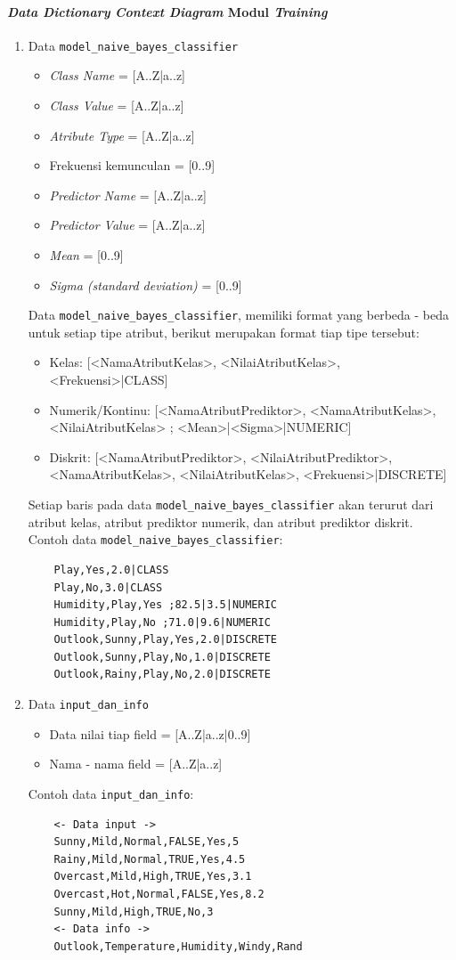 \paragraph{\textit{Data Dictionary} \textit{Context Diagram} Modul \textit{Training}}
\begin{enumerate}
	\item{Data \verb|model_naive_bayes_classifier|}
	\begin{itemize}
		\item \textit{Class Name} = [A..Z|a..z] 
		\item \textit{Class Value} = [A..Z|a..z] 
		\item \textit{Atribute Type} = [A..Z|a..z] 
		\item Frekuensi kemunculan = [0..9] 
		\item \textit{Predictor Name} = [A..Z|a..z]
		\item \textit{Predictor Value} = [A..Z|a..z]
		\item \textit{Mean} = [0..9]
		\item \textit{Sigma (standard deviation)} = [0..9]
	\end{itemize}

	Data \verb|model_naive_bayes_classifier|, memiliki format yang berbeda - beda untuk setiap tipe atribut, berikut merupakan format tiap tipe tersebut:
	\begin{itemize}
		\item Kelas: [<NamaAtributKelas>, <NilaiAtributKelas>, <Frekuensi>|CLASS]
		\item Numerik/Kontinu: [<NamaAtributPrediktor>, <NamaAtributKelas>, <NilaiAtributKelas> ; <Mean>|<Sigma>|NUMERIC]
		\item Diskrit: [<NamaAtributPrediktor>, <NilaiAtributPrediktor>, <NamaAtributKelas>, <NilaiAtributKelas>, <Frekuensi>|DISCRETE]
	\end{itemize}
	
	Setiap baris pada data \verb|model_naive_bayes_classifier| akan terurut dari atribut kelas, atribut prediktor numerik, dan atribut prediktor diskrit. Contoh data \verb|model_naive_bayes_classifier|:
	\begin{lstlisting}
	Play,Yes,2.0|CLASS
	Play,No,3.0|CLASS
	Humidity,Play,Yes ;82.5|3.5|NUMERIC
	Humidity,Play,No ;71.0|9.6|NUMERIC
	Outlook,Sunny,Play,Yes,2.0|DISCRETE
	Outlook,Sunny,Play,No,1.0|DISCRETE
	Outlook,Rainy,Play,No,2.0|DISCRETE
	\end{lstlisting}
		
	\item{Data \verb|input_dan_info|}
	\begin{itemize}
		\item Data nilai tiap field = [A..Z|a..z|0..9] 
		\item Nama - nama field = [A..Z|a..z] 
	\end{itemize}
	Contoh data \verb|input_dan_info|:
	\begin{lstlisting}
	<- Data input ->	
	Sunny,Mild,Normal,FALSE,Yes,5
	Rainy,Mild,Normal,TRUE,Yes,4.5
	Overcast,Mild,High,TRUE,Yes,3.1
	Overcast,Hot,Normal,FALSE,Yes,8.2
	Sunny,Mild,High,TRUE,No,3
	<- Data info ->
	Outlook,Temperature,Humidity,Windy,Rand
	\end{lstlisting}
\end{enumerate}


